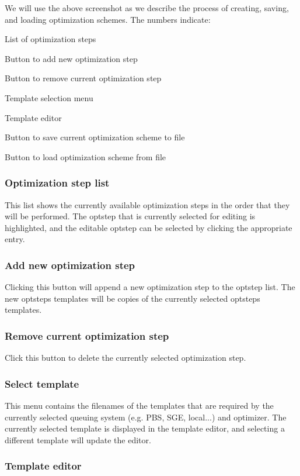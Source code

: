 We will use the above screenshot as we describe the process of creating, saving, and loading optimization schemes. The numbers indicate\+:


\begin{DoxyEnumerate}
\item List of optimization steps
\item Button to add new optimization step
\item Button to remove current optimization step
\item Template selection menu
\item Template editor
\item Button to save current optimization scheme to file
\item Button to load optimization scheme from file
\end{DoxyEnumerate}\hypertarget{optschemes_gui-list}{}\subsubsection{Optimization step list}\label{optschemes_gui-list}
This list shows the currently available optimization steps in the order that they will be performed. The optstep that is currently selected for editing is highlighted, and the editable optstep can be selected by clicking the appropriate entry.\hypertarget{optschemes_gui-add}{}\subsubsection{Add new optimization step}\label{optschemes_gui-add}
Clicking this button will append a new optimization step to the optstep list. The new optstep\textquotesingle{}s templates will be copies of the currently selected optstep\textquotesingle{}s templates.\hypertarget{optschemes_gui-rem}{}\subsubsection{Remove current optimization step}\label{optschemes_gui-rem}
Click this button to delete the currently selected optimization step.\hypertarget{optschemes_gui-tselect}{}\subsubsection{Select template}\label{optschemes_gui-tselect}
This menu contains the filenames of the templates that are required by the currently selected queuing system (e.\+g. P\+B\+S, S\+G\+E, local...) and optimizer. The currently selected template is displayed in the template editor, and selecting a different template will update the editor.\hypertarget{optschemes_gui-editor}{}\subsubsection{Template editor}\label{optschemes_gui-editor}

